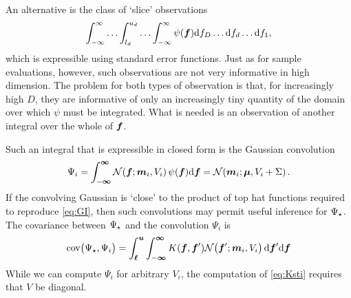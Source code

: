 \documentclass[twoside]{article}
\newcommand{\vm}{\vect{m}}
\newcommand{\vu}{\vect{u}}
\newcommand{\vinf}{\vect{\infty}}
\begin{document}
An alternative is the class of `slice' observations 
\begin{equation}
 \int_{-\infty}^{\infty} \ldots \int_{l_d}^{u_d} \ldots \int_{-\infty}^{\infty} \psi(\boldsymbol{f}) \mathrm{d} f_D \ldots \mathrm{d} f_d\ldots \mathrm{d} f_1,
\end{equation}
which is expressible using standard error functions. Just as for sample evaluations, however, such observations are not very informative in high dimension. The problem for both types of observation is that, for increasingly high $D$, they are informative of only an increasingly tiny quantity of the domain over which $\psi$ must be integrated. What is needed is an observation of another integral over the whole of $\boldsymbol{f}$.

Such an integral that is expressible in closed form is the Gaussian convolution
 \begin{equation}\label{eq:conv}
 \Psi_i = \int_{-\vinf}^{\vinf} \N{\vf}{\vm_i}{V_i} \psi(\vf) \ud \vf = \N{\vm_i}{\vmu}{V_i+\Sigma}.
\end{equation}
 If the convolving Gaussian is `close' to the product of top hat functions required to reproduce \eqref{eq:GI}, then such convolutions may permit useful inference for $\Psi_\star$. The covariance between $\Psi_\star$ and the convolution $\Psi_i$ is
\begin{align}\label{eq:Ksti}
\text{cov}\bigl(\Psi\st, \Psi_i\bigr) =
\int_{\vl}^{\vu} \int_{-\vinf}^{\vinf}  K(\vf, \vf') \N{\vf'}{\vm_i}{V_i} \ud \vf' \ud \vf 
\end{align}
While we can compute $\Psi_i$ for arbitrary $V_i$, the computation of \eqref{eq:Ksti} requires that $V$ be diagonal. 








\end{document}
